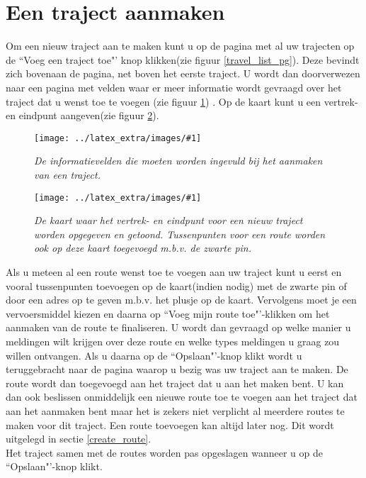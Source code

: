 \documentclass[11pt,twoside,a4paper]{report}
\newcommand*{\copyimageH}[4]{ 			%
	\begin{figure}[Ht]
	\texttt{[image: ../latex\_extra/images/\#1]}
	\caption{\textit{#4}}\label{#2}
	\end{figure}
}
\begin{document}
		\section{Een traject aanmaken}\label{create_trav}
Om een nieuw traject aan te maken kunt u op de pagina met al uw trajecten op de ``Voeg een traject toe"' knop klikken(zie figuur \ref{travel_list_pg}). Deze bevindt zich bovenaan de pagina, net boven het eerste traject. U wordt dan doorverwezen naar een pagina met velden waar er meer informatie wordt gevraagd over het traject dat u wenst toe te voegen (zie figuur \ref{travel_add_pge}) . Op de kaart kunt u een vertrek- en eindpunt aangeven(zie figuur \ref{travel_add_map}).\\
\copyimageH{travel_add.jpg}{travel_add_pge}{\textwidth}{De informatievelden die moeten worden ingevuld bij het aanmaken van een traject.}
\copyimageH{travel_add_2.jpg}{travel_add_map}{\textwidth}{De kaart waar het vertrek- en eindpunt voor een nieuw traject worden opgegeven en getoond. Tussenpunten voor een route worden ook op deze kaart toegevoegd m.b.v. de zwarte pin.}
Als u meteen al een route wenst toe te voegen aan uw traject kunt u eerst en vooral tussenpunten toevoegen op de kaart(indien nodig) met de zwarte pin of door een adres op te geven m.b.v. het plusje op de kaart. Vervolgens moet je een vervoersmiddel kiezen en daarna op ``Voeg mijn route toe"'-klikken om het aanmaken van de route te finaliseren. U wordt dan gevraagd op welke manier u meldingen wilt krijgen over deze route en welke types meldingen u graag zou willen ontvangen. Als u daarna op de ``Opslaan"'-knop klikt wordt u teruggebracht naar de pagina waarop u bezig was uw traject aan te maken. De route wordt dan toegevoegd aan het traject dat u aan het maken bent. U kan dan ook beslissen onmiddelijk een nieuwe route toe te voegen aan het traject dat aan het aanmaken bent maar het is zekers niet verplicht al meerdere routes te maken voor dit traject. Een route toevoegen kan altijd later nog. Dit wordt uitgelegd in sectie \ref{create_route}.\\
Het traject samen met de routes worden pas opgeslagen wanneer u op de ``Opslaan"'-knop klikt.
\end{document}
